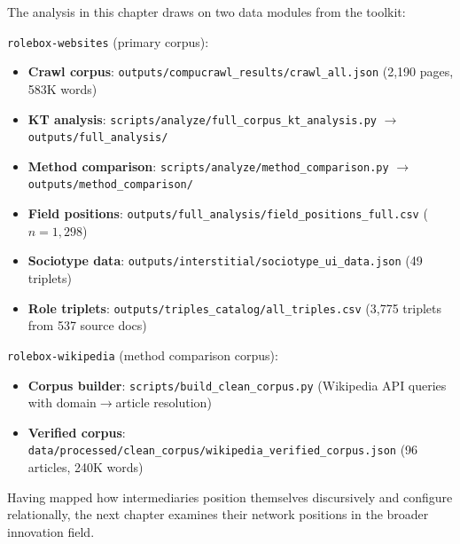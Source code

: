 \documentclass[../main.tex]{subfiles}
\begin{document}
\vspace{0.5em}
\begin{replicationbox}
The analysis in this chapter draws on two data modules from the \RoleBox{} toolkit:

\texttt{rolebox-websites} (primary corpus):
\begin{itemize}[leftmargin=*, itemsep=0.2em]
\item \textbf{Crawl corpus}: \texttt{outputs/compucrawl\_results/crawl\_all.json} (2,190 pages, 583K words)
\item \textbf{KT analysis}: \texttt{scripts/analyze/full\_corpus\_kt\_analysis.py} $\rightarrow$ \texttt{outputs/full\_analysis/}
\item \textbf{Method comparison}: \texttt{scripts/analyze/method\_comparison.py} $\rightarrow$ \texttt{outputs/method\_comparison/}
\item \textbf{Field positions}: \texttt{outputs/full\_analysis/field\_positions\_full.csv} ($n=1{,}298$)
\item \textbf{Sociotype data}: \texttt{outputs/interstitial/sociotype\_ui\_data.json} (49 triplets)
\item \textbf{Role triplets}: \texttt{outputs/triples\_catalog/all\_triples.csv} (3,775 triplets from 537 source docs)
\end{itemize}

\texttt{rolebox-wikipedia} (method comparison corpus):
\begin{itemize}[leftmargin=*, itemsep=0.2em]
\item \textbf{Corpus builder}: \texttt{scripts/build\_clean\_corpus.py} (Wikipedia API queries with domain$\to$article resolution)
\item \textbf{Verified corpus}: \texttt{data/processed/clean\_corpus/wikipedia\_verified\_corpus.json} (96 articles, 240K words)
\end{itemize}
\end{replicationbox}

\vspace{1em}
Having mapped how intermediaries position themselves discursively and configure relationally, the next chapter examines their network positions in the broader innovation field.
\end{document}
